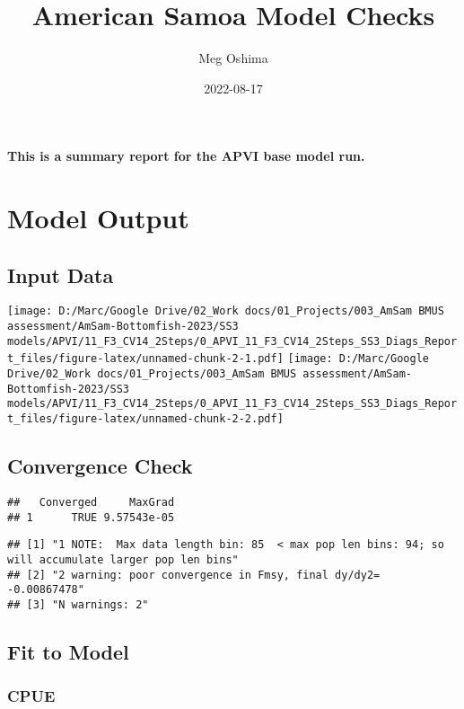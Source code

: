 \documentclass[
]{article}
\title{American Samoa Model Checks}
\author{Meg Oshima}
\date{2022-08-17}
\begin{document}
\maketitle

\textbf{This is a summary report for the APVI base model run.}

\hypertarget{model-output}{%
\section{Model Output}\label{model-output}}

\hypertarget{input-data}{%
\subsection{Input Data}\label{input-data}}

\texttt{[image: D:/Marc/Google Drive/02\_Work docs/01\_Projects/003\_AmSam BMUS assessment/AmSam-Bottomfish-2023/SS3 models/APVI/11\_F3\_CV14\_2Steps/0\_APVI\_11\_F3\_CV14\_2Steps\_SS3\_Diags\_Report\_files/figure-latex/unnamed-chunk-2-1.pdf]}
\texttt{[image: D:/Marc/Google Drive/02\_Work docs/01\_Projects/003\_AmSam BMUS assessment/AmSam-Bottomfish-2023/SS3 models/APVI/11\_F3\_CV14\_2Steps/0\_APVI\_11\_F3\_CV14\_2Steps\_SS3\_Diags\_Report\_files/figure-latex/unnamed-chunk-2-2.pdf]}

\hypertarget{convergence-check}{%
\subsection{Convergence Check}\label{convergence-check}}

\begin{verbatim}
##   Converged     MaxGrad
## 1      TRUE 9.57543e-05
\end{verbatim}

\begin{verbatim}
## [1] "1 NOTE:  Max data length bin: 85  < max pop len bins: 94; so will accumulate larger pop len bins"
## [2] "2 warning: poor convergence in Fmsy, final dy/dy2= -0.00867478"                                  
## [3] "N warnings: 2"
\end{verbatim}

\hypertarget{fit-to-model}{%
\subsection{Fit to Model}\label{fit-to-model}}

\hypertarget{cpue}{%
\subsubsection{CPUE}\label{cpue}}
\end{document}

